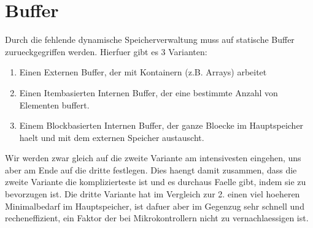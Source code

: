 \documentclass[10pt,a4paper]{article}
\begin{document}
\section{Buffer}
Durch die fehlende dynamische Speicherverwaltung muss auf statische Buffer zurueckgegriffen werden. Hierfuer gibt es 3 Varianten:
\begin{enumerate}
\item Einen Externen Buffer, der mit Kontainern (z.B. Arrays) arbeitet
\item Einen Itembasierten Internen Buffer, der eine bestimmte Anzahl von Elementen buffert.
\item Einem Blockbasierten  Internen Buffer, der ganze Bloecke im Hauptspeicher haelt und mit dem externen Speicher austauscht.
\end{enumerate}
Wir werden zwar gleich auf die zweite Variante am intensivesten eingehen, uns aber am Ende auf die dritte festlegen. Dies haengt damit zusammen, dass die zweite Variante die komplizierteste ist und es durchaus Faelle gibt, indem sie zu bevorzugen ist. Die dritte Variante hat im Vergleich zur 2. einen viel hoeheren Minimalbedarf im Hauptspeicher, ist dafuer aber im Gegenzug sehr schnell und recheneffizient, ein Faktor der bei Mikrokontrollern nicht zu vernachlaessigen ist.
\end{document}
